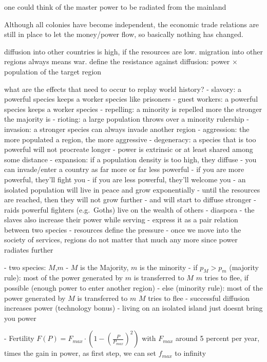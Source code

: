 \documentclass[12pt]{article}
\begin{document}
one could think of the master power to be radiated from the mainland

Although all colonies have become independent, the economic trade relations are still in place
to let the money/power flow, so basically nothing has changed.

diffusion into other countries is high, if the resources are low.
migration into other regions always means war.
define the resistance against diffusion: power $\times$ population of the target region

what are the effects that need to occur to replay world history?
 - slavory: a powerful species keeps a worker species like prisoners 
 - guest workers: a powerful species keeps a worker species
 - repelling: a minority is repelled more the stronger the majority is
 - rioting: a large population throws over a minority rulership
 - invasion: a stronger species can always invade another region
 - aggression: the more populated a region, the more aggressive
 - degeneracy: a species that is too powerful will not procreate longer
 - power is extrinsic or at least shared among some distance
 - expansion: if a population density is too high, they diffuse
 - you can invade/enter a country as far more or far less powerful
 - if you are more powerful, they'll fight you
 - if you are less powerful, they'll welcome you
 - an isolated population will live in peace and grow exponentially
 - until the resources are reached, then they will not grow further
 - and will start to diffuse stronger
 - raids powerful fighters (e.g.~Goths) live on the wealth of others
 - diaspora
 - the slaves also increase their power while serving
 - express it as a pair relation between two species
 - resources define the pressure
 - once we move into the society of services, regions do not matter
 that much any more since power radiates further

 - two species: $M$,$m$
 - $M$ is the Majority, $m$ is the minority
 - if $p_M > p_m$ (majority rule): 
      most of the power generated by $m$ is transferred to $M$
      $m$ tries to flee, if possible (enough power to enter another region)
 - else (minority rule):
      most of the power generated by $M$ is transferred to $m$
      $M$ tries to flee
 - successful diffusion increases power (technology bonus)
 - living on an isolated island just doesnt bring you power

 - Fertility $F(P) = F_{max} \cdot \left( 1 - \left(\frac{P}{P_{max}} \right)^2 \right)$ with $F_{max}$ around 5 percent per year,
    times the gain in power, as first step, we can set $f_{max}$ to infinity
\end{document}
